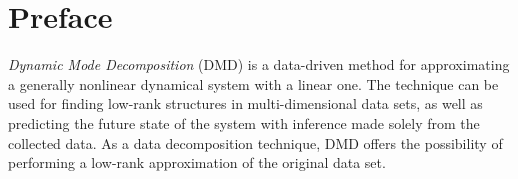 \documentclass[10pt,twocolumn]{article}
\begin{document}

\setlength{\parindent}{0cm}

\vspace{10mm}

\setlength{\parindent}{0cm}

\fontsize{14}{10}\selectfont {Kamila Zdybał}

\vspace{2mm}

\fontsize{8}{10}

\fontsize{8}{10}

\vspace{2mm}



\section*{Preface}

\textit{Dynamic Mode Decomposition} (DMD) is a data-driven method for approximating a generally nonlinear dynamical system with a linear one. The technique can be used for finding low-rank structures in multi-dimensional data sets, as well as predicting the future state of the system with inference made solely from the collected data. As a data decomposition technique, DMD offers the possibility of performing a low-rank approximation of the original data set.
\end{document}
